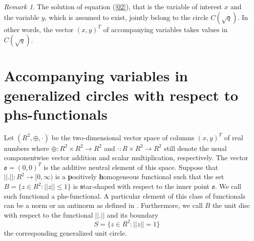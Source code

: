 \documentclass{amsart}
\theoremstyle{definition}
\theoremstyle{remark}
\newtheorem{remark}{Remark}
\numberwithin{equation}{section}
\begin{document}
\begin{remark}The solution of equation (\ref{02}), that is the variable of interest $x$ and the  variable $y$, which is assumed to exist,
 jointly belong to the circle $C(\sqrt{q}).$ In other words,  the vector $(x,y)^T$ of accompanying variables takes values in                    $C(\sqrt{q})$.
\end{remark}
\section{Accompanying variables in generalized circles with respect to phs-functionals}
Let $(R^2,\oplus,\cdot)$ be the two-dimensional vector space of columns $(x,y)^T$ of real numbers where $\oplus:R^2\times R^2\rightarrow R^2$ and $\cdot:R\times R^2\rightarrow R^2$ still denote the usual componentwise vector addition and scalar multiplication, respectively. The vector $\mathfrak o=(0,0)^T$ is the additive neutral element of this space. Suppose that $||.||: R^2\rightarrow [0,\infty)$ is a \textbf{p}ositively \textbf{h}omogeneous  functional such that the set $B=\{z\in R^2:||z||\leq 1\}$ is \textbf{s}tar-shaped with respect to the inner point $\mathfrak o$. We call such functional a phs-functional.
A particular element of this class of functionals can be
 a norm or an antinorm as defined in  \cite{MoRi}. Furthermore, we call $B$  the unit disc with respect to the functional $||.||$ and its boundary
 \[S=\{z\in R^2:||z||=1\}\] the corresponding  generalized unit circle.
\end{document}
